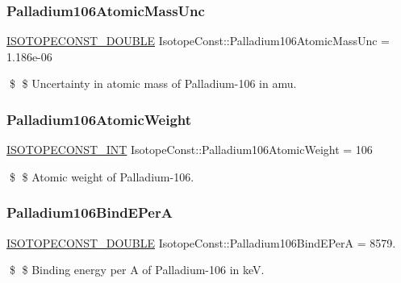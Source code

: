 \subsubsection{\texorpdfstring{Palladium106\+Atomic\+Mass\+Unc}{Palladium106AtomicMassUnc}}
{\footnotesize\ttfamily \mbox{\hyperlink{group___isotope_const-_macros_ga8f45a7272ce02c0b4c65c44636ed719a}{I\+S\+O\+T\+O\+P\+E\+C\+O\+N\+S\+T\+\_\+\+D\+O\+U\+B\+LE}} Isotope\+Const\+::\+Palladium106\+Atomic\+Mass\+Unc = 1.\+186e-\/06}

\$ \$ Uncertainty in atomic mass of Palladium-\/106 in amu. \mbox{\label{group___isotope_const-_palladium-_pd106_ga1057c2ab3d3192bc9eb877bc3a1e205e}} 
\subsubsection{\texorpdfstring{Palladium106\+Atomic\+Weight}{Palladium106AtomicWeight}}
{\footnotesize\ttfamily \mbox{\hyperlink{group___isotope_const-_macros_ga5f18360b3e99483a35c32d789e62621c}{I\+S\+O\+T\+O\+P\+E\+C\+O\+N\+S\+T\+\_\+\+I\+NT}} Isotope\+Const\+::\+Palladium106\+Atomic\+Weight = 106}

\$ \$ Atomic weight of Palladium-\/106. \mbox{\label{group___isotope_const-_palladium-_pd106_gae4c98c794afb72a0e4be837c2af6ba2d}} 
\subsubsection{\texorpdfstring{Palladium106\+Bind\+E\+PerA}{Palladium106BindEPerA}}
{\footnotesize\ttfamily \mbox{\hyperlink{group___isotope_const-_macros_ga8f45a7272ce02c0b4c65c44636ed719a}{I\+S\+O\+T\+O\+P\+E\+C\+O\+N\+S\+T\+\_\+\+D\+O\+U\+B\+LE}} Isotope\+Const\+::\+Palladium106\+Bind\+E\+PerA = 8579.}

\$ \$ Binding energy per A of Palladium-\/106 in keV. \mbox{\label{group___isotope_const-_palladium-_pd106_ga8c7fdf29c087dfcf792450a3e94601d5}} 

